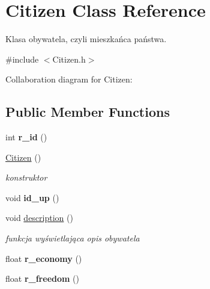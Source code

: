 \hypertarget{classCitizen}{\section{Citizen Class Reference}
\label{classCitizen}
}


Klasa obywatela, czyli mieszkańca państwa.  




{\ttfamily \#include $<$Citizen.\+h$>$}



Collaboration diagram for Citizen\+:
\subsection*{Public Member Functions}
\begin{DoxyCompactItemize}
\item 
\hypertarget{classCitizen_a677ca68462c202b11974f519017dec5a}{int {\bfseries r\+\_\+id} ()}\label{classCitizen_a677ca68462c202b11974f519017dec5a}

\item 
\hypertarget{classCitizen_a3951355c9f2d7260debedd29b163dbe6}{\hyperlink{classCitizen_a3951355c9f2d7260debedd29b163dbe6}{Citizen} ()}\label{classCitizen_a3951355c9f2d7260debedd29b163dbe6}

\begin{DoxyCompactList}\small\item\em konstruktor \end{DoxyCompactList}\item 
\hypertarget{classCitizen_a2b52f590d05135fc1ba67b7493e49fa6}{void {\bfseries id\+\_\+up} ()}\label{classCitizen_a2b52f590d05135fc1ba67b7493e49fa6}

\item 
\hypertarget{classCitizen_a020a6d03b0e9ca89da0dfeada0ca2fc9}{void \hyperlink{classCitizen_a020a6d03b0e9ca89da0dfeada0ca2fc9}{description} ()}\label{classCitizen_a020a6d03b0e9ca89da0dfeada0ca2fc9}

\begin{DoxyCompactList}\small\item\em funkcja wyświetlająca opis obywatela \end{DoxyCompactList}\item 
\hypertarget{classCitizen_a2dc2fe6764276445057e170a4cb3bee6}{float {\bfseries r\+\_\+economy} ()}\label{classCitizen_a2dc2fe6764276445057e170a4cb3bee6}

\item 
\hypertarget{classCitizen_ab0afeae6e2ba7c9f91be452547c344df}{float {\bfseries r\+\_\+freedom} ()}\label{classCitizen_ab0afeae6e2ba7c9f91be452547c344df}


\end{DoxyCompactItemize}
